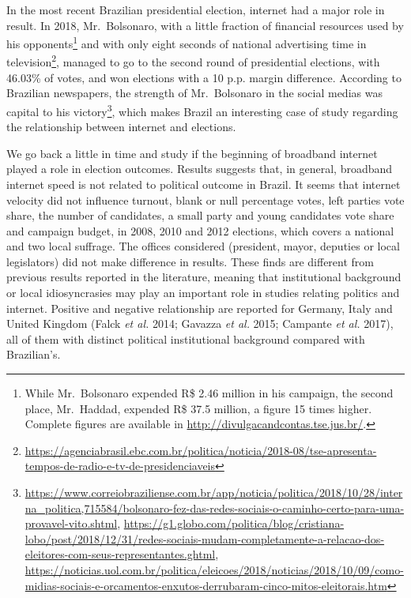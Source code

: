 \documentclass[
  12pt,
]{article}
\begin{document}
In the most recent Brazilian presidential election, internet had a major
role in result. In 2018, Mr.~Bolsonaro, with a little fraction of
financial resources used by his opponents\footnote{While Mr.~Bolsonaro
  expended R\$ 2.46 million in his campaign, the second place,
  Mr.~Haddad, expended R\$ 37.5 million, a figure 15 times higher.
  Complete figures are available in
  \url{http://divulgacandcontas.tse.jus.br/}.} and with only eight
seconds of national advertising time in television\footnote{\url{https://agenciabrasil.ebc.com.br/politica/noticia/2018-08/tse-apresenta-tempos-de-radio-e-tv-de-presidenciaveis}},
managed to go to the second round of presidential elections, with
46.03\% of votes, and won elections with a 10 p.p. margin difference.
According to Brazilian newspapers, the strength of Mr.~Bolsonaro in the
social medias was capital to his victory\footnote{\url{https://www.correiobraziliense.com.br/app/noticia/politica/2018/10/28/interna_politica,715584/bolsonaro-fez-das-redes-sociais-o-caminho-certo-para-uma-provavel-vito.shtml},
  \url{https://g1.globo.com/politica/blog/cristiana-lobo/post/2018/12/31/redes-sociais-mudam-completamente-a-relacao-dos-eleitores-com-seus-representantes.ghtml},
  \url{https://noticias.uol.com.br/politica/eleicoes/2018/noticias/2018/10/09/como-midias-sociais-e-orcamentos-enxutos-derrubaram-cinco-mitos-eleitorais.htm}},
which makes Brazil an interesting case of study regarding the
relationship between internet and elections.

We go back a little in time and study if the beginning of broadband
internet played a role in election outcomes. Results suggests that, in
general, broadband internet speed is not related to political outcome in
Brazil. It seems that internet velocity did not influence turnout, blank
or null percentage votes, left parties vote share, the number of
candidates, a small party and young candidates vote share and campaign
budget, in 2008, 2010 and 2012 elections, which covers a national and
two local suffrage. The offices considered (president, mayor, deputies
or local legislators) did not make difference in results. These finds
are different from previous results reported in the literature, meaning
that institutional background or local idiosyncrasies may play an
important role in studies relating politics and internet. Positive and
negative relationship are reported for Germany, Italy and United Kingdom
(Falck \emph{et al.} 2014; Gavazza \emph{et al.} 2015; Campante \emph{et
al.} 2017), all of them with distinct political institutional background
compared with Brazilian's.
\end{document}
